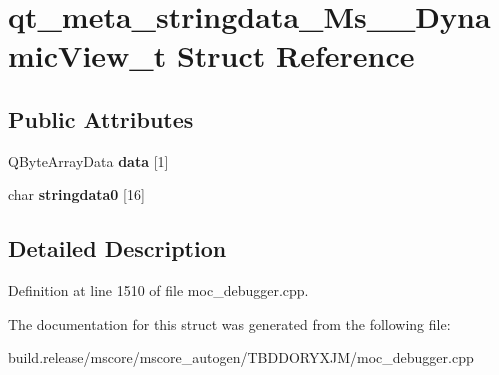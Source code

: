 \hypertarget{structqt__meta__stringdata___ms_____dynamic_view__t}{}\section{qt\+\_\+meta\+\_\+stringdata\+\_\+\+Ms\+\_\+\+\_\+\+Dynamic\+View\+\_\+t Struct Reference}
\label{structqt__meta__stringdata___ms_____dynamic_view__t}
\subsection*{Public Attributes}
\begin{DoxyCompactItemize}
\item 
\mbox{\label{structqt__meta__stringdata___ms_____dynamic_view__t_ad5a44263c5f6c45425cefdf5bf1f5a3a}} 
Q\+Byte\+Array\+Data {\bfseries data} \mbox{[}1\mbox{]}
\item 
\mbox{\label{structqt__meta__stringdata___ms_____dynamic_view__t_a5d3369d568871a6234e4e54fe2a7520b}} 
char {\bfseries stringdata0} \mbox{[}16\mbox{]}
\end{DoxyCompactItemize}


\subsection{Detailed Description}


Definition at line 1510 of file moc\+\_\+debugger.\+cpp.



The documentation for this struct was generated from the following file\+:\begin{DoxyCompactItemize}
\item 
build.\+release/mscore/mscore\+\_\+autogen/\+T\+B\+D\+D\+O\+R\+Y\+X\+J\+M/moc\+\_\+debugger.\+cpp\end{DoxyCompactItemize}
